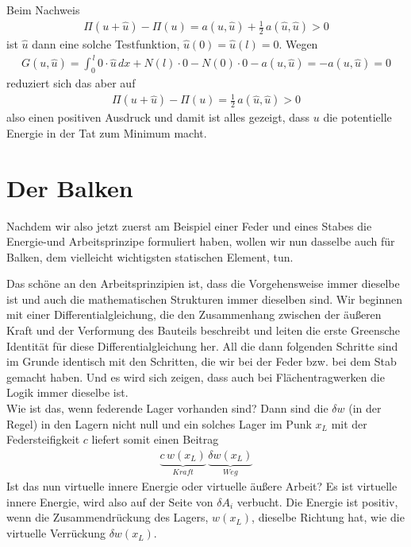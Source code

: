 Beim Nachweis
\begin{align}
\Pi(u + \hat{u}) - \Pi(u) =  a(u,\hat{u}) + \frac{1}{2}\, a(\hat{u},\hat{u}) > 0
\end{align}
ist $\hat{u}$ dann eine solche Testfunktion, $\hat{u}(0) = \hat{u}(l) = 0$. Wegen
\begin{align}
G(u,\hat{u}) = \int_0^{\,l} 0\cdot \hat{u}\,dx + N(l)\cdot 0 - N(0)\cdot 0 - a(u,\hat{u}) = - a(u,\hat{u}) = 0
\end{align}
reduziert sich das aber auf
\begin{align}
\Pi(u + \hat{u}) - \Pi(u) =  \frac{1}{2}\, a(\hat{u},\hat{u}) > 0
\end{align}
also einen positiven Ausdruck und damit ist alles gezeigt, dass $u$ die potentielle Energie in der Tat zum Minimum macht.\\

\section{Der Balken}
Nachdem wir also jetzt zuerst am Beispiel einer Feder und eines Stabes die Energie-und Arbeitsprinzipe formuliert haben, wollen wir nun dasselbe auch f\"{u}r Balken, dem vielleicht wichtigsten statischen Element, tun.

Das sch\"{o}ne an den Arbeitsprinzipien ist, dass die Vorgehensweise immer dieselbe ist und auch die mathematischen Strukturen immer dieselben sind. Wir beginnen mit einer Differentialgleichung, die den Zusammenhang zwischen der \"{a}u{\ss}eren Kraft und der Verformung des Bauteils beschreibt und leiten die erste Greensche Identit\"{a}t f\"{u}r diese Differentialgleichung her. All die dann folgenden Schritte sind im Grunde identisch mit den Schritten, die wir bei der Feder bzw. bei dem Stab gemacht haben. Und es wird sich zeigen, dass auch bei Fl\"{a}chentragwerken die Logik immer dieselbe ist.\\

Wie ist das, wenn federende Lager vorhanden sind? Dann sind die $\delta w $ (in der Regel) in den Lagern nicht null und ein solches Lager im Punk $x_L$ mit der Federsteifigkeit $c $ liefert somit einen Beitrag
\begin{align} \label{Eq22}
\underbrace{c\,w(x_L)}_{Kraft}\,\underbrace{\delta w(x_L)}_{Weg}
\end{align}
Ist das nun virtuelle innere Energie oder virtuelle \"{a}u{\ss}ere Arbeit? Es ist
virtuelle innere Energie, wird also auf der Seite von $\delta A_i $ verbucht. Die Energie ist positiv, wenn die Zusammendr\"{u}ckung des Lagers, $w(x_L) $, dieselbe Richtung hat, wie die virtuelle Verr\"{u}ckung $\delta w(x_L) $.

